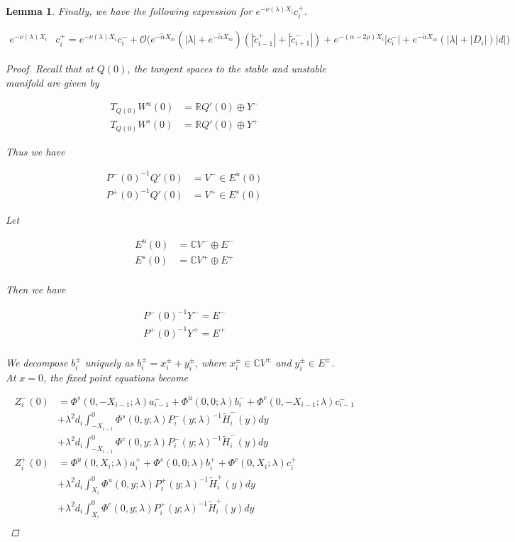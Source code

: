 \documentclass[12pt]{article}
\def\R{{\mathbb R}}
\def\C{{\mathbb C}}
\newtheorem{lemma}{Lemma}
\begin{document}
\begin{lemma}
Finally, we have the following expression for $e^{-\nu(\lambda)X_i} c_i^+$.

\begin{align}\label{tildecminus2}
e^{-\nu(\lambda)X_i} &c_i^+ = e^{-\nu(\lambda)X_i} c_i^- 
+ \mathcal{O}\Big( e^{-\tilde{\alpha}X_m} (|\lambda| + e^{-\tilde{\alpha}X_m})( |\tilde{c}_{i-1}^+| + |\tilde{c}_{i+1}^-|) 
+ e^{-(\alpha - 2 \rho)X_i}|c_i^-| +  e^{-\tilde{\alpha}X_m}(|\lambda| + |D_i|)|d| \Big)
\end{align}

\begin{proof}

Recall that at $Q(0)$, the tangent spaces to the stable and unstable manifold are given by

\begin{align*}
T_{Q(0)} W^u(0) &= \R Q'(0) \oplus Y^- \\
T_{Q(0)} W^s(0) &= \R Q'(0) \oplus Y^+
\end{align*}

Thus we have

\begin{align*}
P^-(0)^{-1} Q'(0) &= V^- \in E^u(0) \\
P^+(0)^{-1} Q'(0) &= V^+ \in E^s(0)
\end{align*}

Let

\begin{align*}
E^u(0) &= \C V^- \oplus E^- \\
E^s(0) &= \C V^+ \oplus E^+ \\
\end{align*}

Then we have

\begin{align*}
P^-(0)^{-1} Y^- = E^- \\
P^+(0)^{-1} Y^+ = E^+ \\
\end{align*}

We decompose $b_i^\pm$ uniquely as $b_i^\pm = x_i^\pm + y_i^\pm$, where $x_i^\pm \in \C V^\pm$ and $y_i^\pm \in E^\pm$.\\

At $x = 0$, the fixed point equations become

\begin{align*}
Z_i^-(0) &= \Phi^s(0, -X_{i-1}; \lambda) a_{i-1}^- + \Phi^u(0, 0; \lambda) b_i^- + \Phi^c(0, -X_{i-1}; \lambda) c_{i-1}^- \\
&+ \lambda^2 d_i \int_{-X_{i-1}}^0 \Phi^s(0, y; \lambda) P_i^-(y; \lambda)^{-1} \tilde{H}_i^-(y) dy \\
&+ \lambda^2 d_i \int_{-X_{i-1}}^0 \Phi^c(0, y; \lambda) P_i^-(y; \lambda)^{-1} \tilde{H}_i^-(y) dy  \\ 
Z_i^+(0) &= \Phi^u(0, X_i; \lambda) a_i^+ + \Phi^s(0, 0; \lambda) b_i^+ + \Phi^c(0, X_i; \lambda) c_i^+ \\
&+ \lambda^2 d_i \int_{X_i}^0 \Phi^u(0, y; \lambda) P_i^+(y; \lambda)^{-1} \tilde{H}_i^+(y) dy \\
&+ \lambda^2 d_i \int_{X_i}^0 \Phi^c(0, y; \lambda) P_i^+(y; \lambda)^{-1} \tilde{H}_i^+(y) dy \\
\end{align*}


\end{proof}
\end{lemma}
\end{document}
